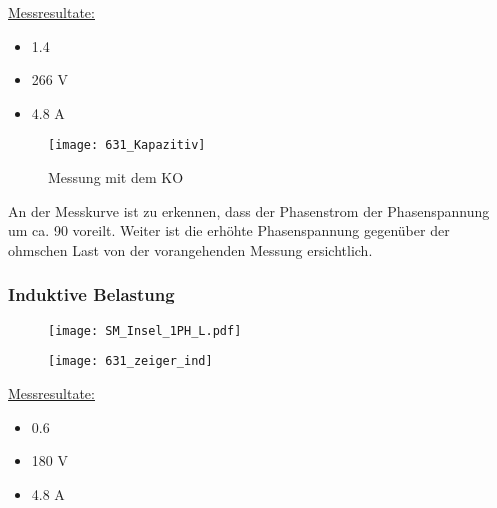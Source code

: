 \begin{flushleft}
\underline{Messresultate:}\\
\vspace{0.3cm}


\begin{itemize}
\item {}            1.4\degree
\item {}            266 V
\item {}            4.8 A
\end{itemize}

\vspace{0.5cm}

\begin{figure}[H]
    \centering
    \texttt{[image: 631\_Kapazitiv]}
    \caption{Messung mit dem KO}
    \label{fig:abb1}
\end{figure}

An der Messkurve ist zu erkennen, dass der Phasenstrom der Phasenspannung um ca. 90 \degree voreilt. Weiter ist die erhöhte Phasenspannung gegenüber der ohmschen Last von der vorangehenden Messung ersichtlich. 









\newpage




\subsubsection{Induktive Belastung}

\begin{figure}[H]
\begin{minipage}[t]{0.52\textwidth}
\centering
\texttt{[image: SM\_Insel\_1PH\_L.pdf]}
\label{fig:abb1}
\end{minipage}
\begin{minipage}[t]{0.48\textwidth}
\centering
\texttt{[image: 631\_zeiger\_ind]}
    \label{fig:abb1}
\end{minipage}
\end{figure}


\underline{Messresultate:}\\
\vspace{0.3cm}


\begin{itemize}
\item {}     0.6\degree
\item {}            180 V
\item {}            4.8 A
\end{itemize}


\end{flushleft}
